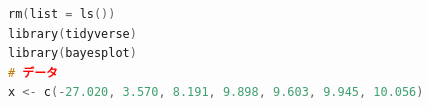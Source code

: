 \begin{lstlisting}[language=C++,label={code:18_02},caption={環境の準備と共通部分}]
rm(list = ls())
library(tidyverse)
library(bayesplot)
# データ
x <- c(-27.020, 3.570, 8.191, 9.898, 9.603, 9.945, 10.056)
\end{lstlisting}
